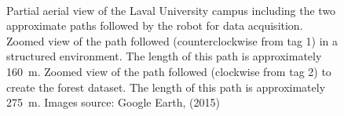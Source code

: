 \begin{figure}[h]
    \centering
    \\ \vspace{3mm}
     \hspace{2mm}
    \caption{\protect{} Partial aerial view of the Laval University campus including the two approximate paths followed by the robot for data acquisition. \protect{} Zoomed view of the path followed (counterclockwise from tag 1) in a structured environment. The length of this path is approximately \SI{160}{\meter}. \protect{} Zoomed view of the path followed (clockwise from tag 2) to create the forest dataset. The length of this path is approximately \SI{275}{\meter}. Images source: Google Earth, (2015)}
    \label{fig:chap_slam_path}
\end{figure}

